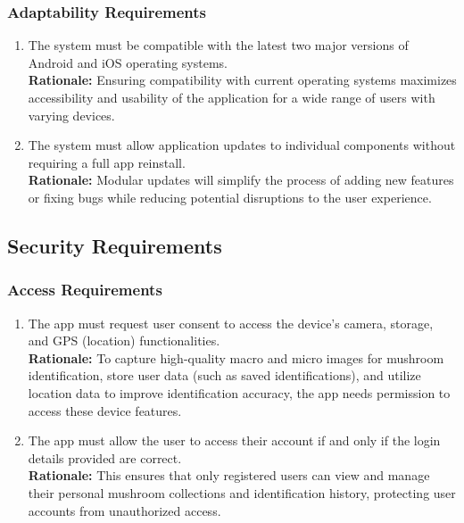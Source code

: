 \documentclass[]{article}
\begin{document}
\begin{enumerate}[{\bf BE1.}]
\subsubsection{Adaptability Requirements}
\label{ssub:adaptability_requirements}
\begin{enumerate}[{MS-A}1. ]
	\item The system must be compatible with the latest two major versions of Android and iOS operating systems. \\
	\textbf{Rationale:} Ensuring compatibility with current operating systems maximizes accessibility and usability of the application for a wide range of users with varying devices.
	\item The system must allow application updates to individual components without requiring a full app reinstall. \\
	\textbf{Rationale:} Modular updates will simplify the process of adding new features or fixing bugs while reducing potential disruptions to the user experience.
\end{enumerate}


\subsection{Security Requirements}
\label{sub:security_requirements}

\subsubsection{Access Requirements}
\label{ssub:access_requirements}
\begin{enumerate}[{SR-AC}1. ]
	\item The app must request user consent to access the device's camera, storage, and GPS (location) functionalities.\\
	\textbf{Rationale:} To capture high-quality macro and micro images for mushroom identification, store user data (such as saved identifications), and utilize location data to improve identification accuracy, the app needs permission to access these device features.
	\item The app must allow the user to access their account if and only if the login details provided are correct.\\
	\textbf{Rationale:} This ensures that only registered users can view and manage their personal mushroom collections and identification history, protecting user accounts from unauthorized access.
\end{enumerate}


\end{enumerate}
\end{document}
